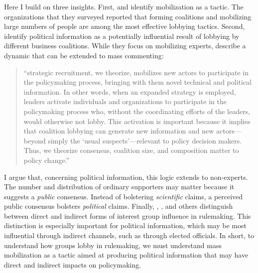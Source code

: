 Here I build on three insights. First, \citet{Furlong1997} and  \citet{Kerwin2011} identify mobilization as a tactic. The organizations that they surveyed reported that forming coalitions and mobilizing large numbers of people are among the most effective lobbying tactics. Second, \citet{Nelson2012} identify political information as a potentially influential result of lobbying by different business coalitions. While they focus on mobilizing experts, \citet{Nelson2012} describe a dynamic that can be extended to mass commenting: 
\begin{quote}
``strategic recruitment, we theorize, mobilizes new actors to participate in the policymaking process, bringing with them novel technical and political information. In other words, when an expanded strategy is employed, leaders activate individuals and organizations to participate in the policymaking process who, without the coordinating efforts of the leaders, would otherwise not lobby. This activation is important because it implies that coalition lobbying can generate new information and new actors---beyond simply the `usual suspects'---relevant to policy decision makers. Thus, we theorize consensus, coalition size, and composition matter to policy change.'' 
\end{quote}
I argue that, concerning political information, this logic extends to non-experts. The number and distribution of ordinary supporters may matter because it suggests a \textit{public} consensus. Instead of bolstering \textit{scientific} claims, a perceived public consensus bolsters \textit{political} claims.
Finally, \citet{Furlong1998}, \citet{Yackee2006JPART}, and others distinguish between direct and indirect forms of interest group influence in rulemaking. This distinction is especially important for political information, which may be most influential through indirect channels, such as through elected officials. In short, to understand how groups lobby in rulemaking, we must understand mass mobilization as a tactic aimed at producing political information that may have direct and indirect impacts on policymaking.%


